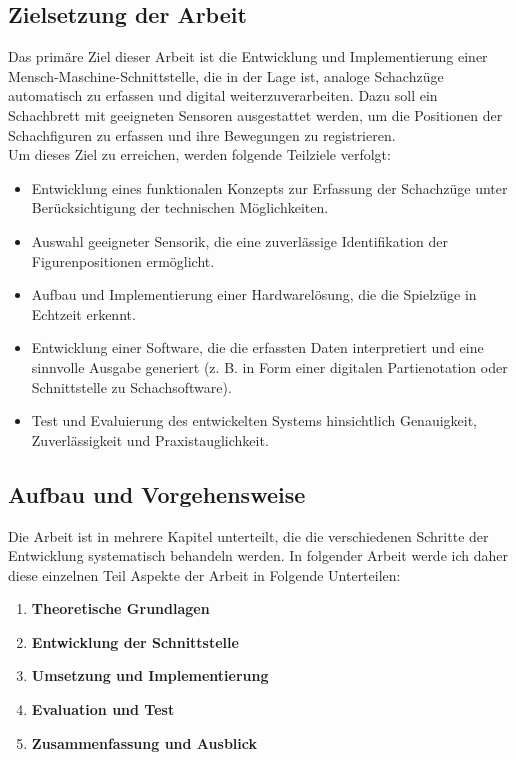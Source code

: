 \documentclass[a4paper]{article}
\begin{document}
	\subsection{Zielsetzung der Arbeit}
	\label{sec:Zielsetzung der Arbeit}
	Das primäre Ziel dieser Arbeit ist die Entwicklung und Implementierung einer Mensch-Maschine-Schnittstelle, die in der Lage ist, analoge Schachzüge automatisch zu erfassen und digital weiterzuverarbeiten. Dazu soll ein Schachbrett mit geeigneten Sensoren ausgestattet werden, um die Positionen der Schachfiguren zu erfassen und ihre Bewegungen zu registrieren.\\[1ex]
	Um dieses Ziel zu erreichen, werden folgende Teilziele verfolgt:
	\begin{itemize}
		\item Entwicklung eines funktionalen Konzepts zur Erfassung der Schachzüge unter Berücksichtigung der technischen Möglichkeiten.
		\item Auswahl geeigneter Sensorik, die eine zuverlässige Identifikation der Figurenpositionen ermöglicht.
		\item Aufbau und Implementierung einer Hardwarelösung, die die Spielzüge in Echtzeit erkennt.
		\item Entwicklung einer Software, die die erfassten Daten interpretiert und eine sinnvolle Ausgabe generiert (z. B. in Form einer digitalen Partienotation oder Schnittstelle zu Schachsoftware).
		\item Test und Evaluierung des entwickelten Systems hinsichtlich Genauigkeit, Zuverlässigkeit und Praxistauglichkeit.
	\end{itemize}
	
	\subsection{Aufbau und Vorgehensweise}
	
	Die Arbeit ist in mehrere Kapitel unterteilt, die die verschiedenen Schritte der Entwicklung systematisch behandeln werden. In folgender Arbeit werde ich daher diese einzelnen Teil Aspekte der Arbeit in Folgende Unterteilen: 
	\begin{enumerate}
	\item \textbf{Theoretische Grundlagen}
	\item \textbf{Entwicklung der Schnittstelle}
	\item \textbf{Umsetzung und Implementierung}
	\item \textbf{Evaluation und Test}
	\item \textbf{Zusammenfassung und Ausblick}
\end{enumerate}
\end{document}
